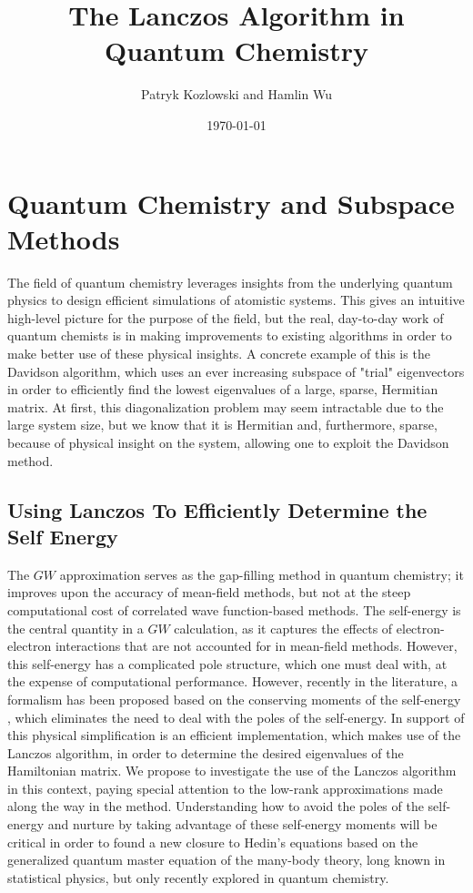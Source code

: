 \documentclass[12pt]{article} %
\title{The Lanczos Algorithm in Quantum Chemistry}
\author{Patryk Kozlowski and Hamlin Wu}
\date{\today}
\begin{document}
\maketitle
\section{Quantum Chemistry and Subspace Methods}
The field of quantum chemistry leverages insights from the underlying quantum physics to design efficient simulations of atomistic systems. This gives an intuitive high-level picture for the purpose of the field, but the real, day-to-day work of quantum chemists is in making improvements to existing algorithms in order to make better use of these physical insights. A concrete example of this is the Davidson algorithm, which uses an ever increasing subspace of "trial" eigenvectors in order to efficiently find the lowest eigenvalues of a large, sparse, Hermitian matrix. At first, this diagonalization problem may seem intractable due to the large system size, but we know that it is Hermitian and, furthermore, sparse, because of physical insight on the system, allowing one to exploit the Davidson method.
\subsection{Using Lanczos To Efficiently Determine the Self Energy}
The $GW$ approximation serves as the gap-filling method in quantum chemistry; it improves upon the accuracy of mean-field methods, but not at the steep computational cost of correlated wave function-based methods. The self-energy is the central quantity in a $GW$ calculation, as it captures the effects of electron-electron interactions that are not accounted for in mean-field methods. However, this self-energy has a complicated pole structure, which one must deal with, at the expense of computational performance. However, recently in the literature, a formalism has been proposed based on the conserving moments of the self-energy \cite{scott2023moment}, which eliminates the need to deal with the poles of the self-energy. In support of this physical simplification is an efficient implementation, which makes use of the Lanczos algorithm, in order to determine the desired eigenvalues of the Hamiltonian matrix. We propose to investigate the use of the Lanczos algorithm in this context, paying special attention to the low-rank approximations made along the way in the method. Understanding how to avoid the poles of the self-energy and nurture by taking advantage of these self-energy moments will be critical in order to found a new closure to Hedin's equations based on the generalized quantum master equation of the many-body theory, long known in statistical physics, but only recently explored in quantum chemistry.



\end{document}

